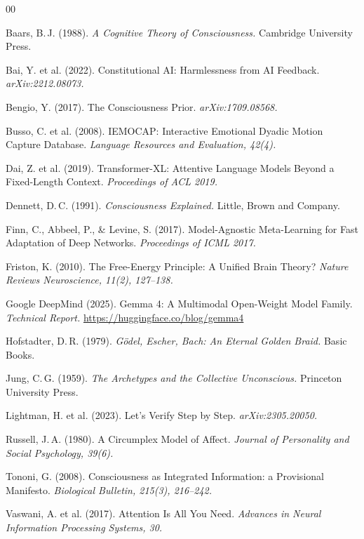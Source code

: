 \documentclass[conference]{IEEEtran}
\begin{document}
\begin{thebibliography}{00}

Baars, B.\,J. (1988).
\textit{A Cognitive Theory of Consciousness.}
Cambridge University Press.

Bai, Y. et al. (2022).
Constitutional AI: Harmlessness from AI Feedback.
\textit{arXiv:2212.08073.}

Bengio, Y. (2017).
The Consciousness Prior.
\textit{arXiv:1709.08568.}

Busso, C. et al. (2008).
IEMOCAP: Interactive Emotional Dyadic Motion Capture Database.
\textit{Language Resources and Evaluation, 42(4).}

Dai, Z. et al. (2019).
Transformer-XL: Attentive Language Models Beyond a Fixed-Length Context.
\textit{Proceedings of ACL 2019.}

Dennett, D.\,C. (1991).
\textit{Consciousness Explained.}
Little, Brown and Company.

Finn, C., Abbeel, P., \& Levine, S. (2017).
Model-Agnostic Meta-Learning for Fast Adaptation of Deep Networks.
\textit{Proceedings of ICML 2017.}

Friston, K. (2010).
The Free-Energy Principle: A Unified Brain Theory?
\textit{Nature Reviews Neuroscience, 11(2), 127--138.}

Google DeepMind (2025).
Gemma 4: A Multimodal Open-Weight Model Family.
\textit{Technical Report.} \url{https://huggingface.co/blog/gemma4}

Hofstadter, D.\,R. (1979).
\textit{Gödel, Escher, Bach: An Eternal Golden Braid.}
Basic Books.

Jung, C.\,G. (1959).
\textit{The Archetypes and the Collective Unconscious.}
Princeton University Press.

Lightman, H. et al. (2023).
Let's Verify Step by Step.
\textit{arXiv:2305.20050.}

Russell, J.\,A. (1980).
A Circumplex Model of Affect.
\textit{Journal of Personality and Social Psychology, 39(6).}

Tononi, G. (2008).
Consciousness as Integrated Information: a Provisional Manifesto.
\textit{Biological Bulletin, 215(3), 216--242.}

Vaswani, A. et al. (2017).
Attention Is All You Need.
\textit{Advances in Neural Information Processing Systems, 30.}

\end{thebibliography}
\end{document}
